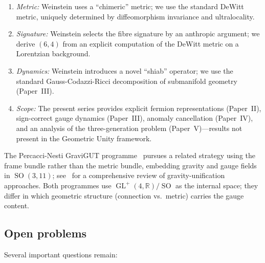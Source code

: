 \documentclass[12pt,a4paper]{article}
\theoremstyle{definition}
\newcommand{\GL}{\operatorname{GL}}
\newcommand{\SO}{\operatorname{SO}}
\newcommand{\R}{\mathbb{R}}
\begin{document}
\begin{enumerate}[nosep]
\item \emph{Metric:} Weinstein uses a ``chimeric'' metric; we use the standard DeWitt metric, uniquely determined by diffeomorphism invariance and ultralocality.
\item \emph{Signature:} Weinstein selects the fibre signature by an anthropic argument; we derive $(6,4)$ from an explicit computation of the DeWitt metric on a Lorentzian background.
\item \emph{Dynamics:} Weinstein introduces a novel ``shiab'' operator; we use the standard Gauss-Codazzi-Ricci decomposition of submanifold geometry (Paper~III).
\item \emph{Scope:} The present series provides explicit fermion representations (Paper~II), sign-correct gauge dynamics (Paper~III), anomaly cancellation (Paper~IV), and an analysis of the three-generation problem (Paper~V)---results not present in the Geometric Unity framework.
\end{enumerate}

The Percacci-Nesti GraviGUT programme~\cite{PercacciNesti2010} pursues a related strategy using the frame bundle rather than the metric bundle, embedding gravity and gauge fields in $\SO(3,11)$; see~\cite{KrasnovPercacci2018} for a comprehensive review of gravity-unification approaches.
Both programmes use $\GL^+(4,\R)/\SO$ as the internal space; they differ in which geometric structure (connection vs.\ metric) carries the gauge content.

\subsection{Open problems}

Several important questions remain:
\end{document}
